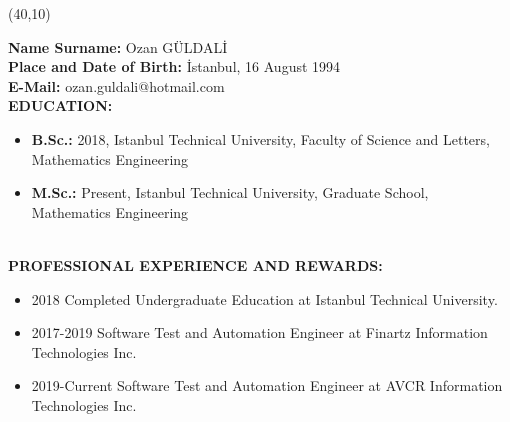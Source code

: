 \vspace{10mm}

\newsavebox{\mysquare}
\savebox{\mysquare}{\textcolor{black}{\rule[2.3pt]{3.4pt}{3.4pt}}}

\setlength{\TPHorizModule}{10pt}
\setlength{\TPVertModule}{10pt}
\begin{textblock}{1}(40,10)

\begin{comment}
 \begin{figure}[p]
 \texttt{[image: fig/vesikalık.jpeg]}
\end{figure}
\end{comment}

\end{textblock}
\textbf{Name Surname:} Ozan GÜLDALİ\\

\vspace{-3mm}
\textbf{Place and Date of Birth:} İstanbul, 16 August 1994\\

\vspace{-3mm}
\textbf{E-Mail:} ozan.guldali@hotmail.com\\


\textbf{EDUCATION:}
\begin{itemize}
  \item \textbf{B.Sc.:} 2018, Istanbul Technical University, Faculty of Science and Letters, Mathematics Engineering
  \item \textbf{M.Sc.:} Present, Istanbul Technical University, Graduate School, Mathematics Engineering
\end{itemize}

\textbf{ }\\

\textbf{PROFESSIONAL EXPERIENCE AND REWARDS:}
\begin{itemize}
  \item 2018 Completed Undergraduate Education at Istanbul Technical University.
  \item 2017-2019 Software Test and Automation Engineer at Finartz Information Technologies Inc.
  \item 2019-Current Software Test and Automation Engineer at AVCR Information Technologies Inc.
\end{itemize}

